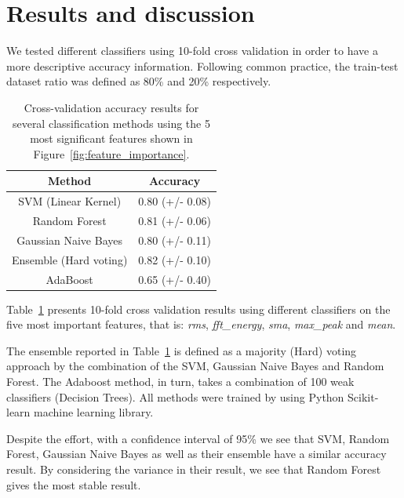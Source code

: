 \section{Results and discussion}\label{sec:activity_discussion}

We tested different classifiers using 10-fold cross validation in order to have a more descriptive accuracy information. Following common practice, the train-test dataset ratio was defined as 80\% and 20\% respectively.

\begin{table}[h]\footnotesize
  \centering
  \caption{Cross-validation accuracy results for several classification methods using the 5 most significant features shown in Figure~\ref{fig:feature_importance}.
  }
  \begin{tabular}{| c | c |}
    \hline
  	   \textbf{Method}          & \textbf{Accuracy}\\\hline
       SVM (Linear Kernel)      & 0.80 (+/- 0.08)  \\\hline
       Random Forest            & 0.81 (+/- 0.06)  \\\hline
       Gaussian Naive Bayes     & 0.80 (+/- 0.11)  \\\hline
       Ensemble (Hard voting)   & 0.82 (+/- 0.10)  \\\hline
       AdaBoost                 & 0.65 (+/- 0.40)   \\\hline
  \end{tabular}
  \label{accuracy5best}
\end{table}


Table~\ref{accuracy5best} presents 10-fold cross validation results using different classifiers on the five most important features, that is: \textit{rms}, \textit{fft\_energy}, \textit{sma}, \textit{max\_peak} and \textit{mean}. 

The ensemble reported in Table~\ref{accuracy5best} is defined as a majority (Hard) voting approach by the combination of the SVM, Gaussian Naive Bayes and Random Forest. The Adaboost method, in turn, takes a combination of 100 weak classifiers (Decision Trees). All methods were trained by using Python Scikit-learn machine learning library.

Despite the effort, with a confidence interval of 95\% we see that SVM, Random Forest, Gaussian Naive Bayes as well as their ensemble have a similar accuracy result. By considering the variance in their result, we see that Random Forest gives the most stable result. 

